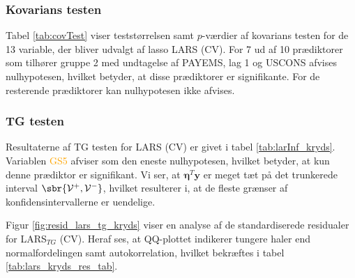 \subsubsection{Kovarians testen}
Tabel \ref{tab:covTest} viser teststørrelsen samt $p$-værdier af kovarians testen for de 13 variable, der bliver udvalgt af lasso LARS (CV). 
For 7 ud af 10 prædiktorer som tilhører gruppe 2 med undtagelse af \textcolor{blue3}{PAYEMS}, \textcolor{blue3}{lag 1} og \textcolor{blue3}{USCONS} afvises nulhypotesen, hvilket betyder, at disse prædiktorer er signifikante.
For de resterende prædiktorer kan nulhypotesen ikke afvises.



\subsubsection{TG testen}
Resultaterne af TG testen for LARS (CV) er givet i tabel \ref{tab:larInf_kryds}.
Variablen  \textcolor{orange}{GS5} afviser som den eneste nulhypotesen, hvilket betyder, at kun denne prædiktor er signifikant.
Vi ser, at $\boldsymbol{\eta}^T \textbf{y}$ er meget tæt på det trunkerede interval \(\sbr{\mathcal{V}^+, \mathcal{V}^-}\), hvilket resulterer i, at de fleste grænser af konfidensintervallerne er uendelige. 



Figur \ref{fig:resid_lars_tg_kryds} viser en analyse af de standardiserede residualer for LARS$_{TG}$ (CV). 
Heraf ses, at QQ-plottet indikerer tungere haler end normalfordelingen samt autokorrelation, hvilket bekræftes i tabel \ref{tab:lars_kryds_res_tab}. 





